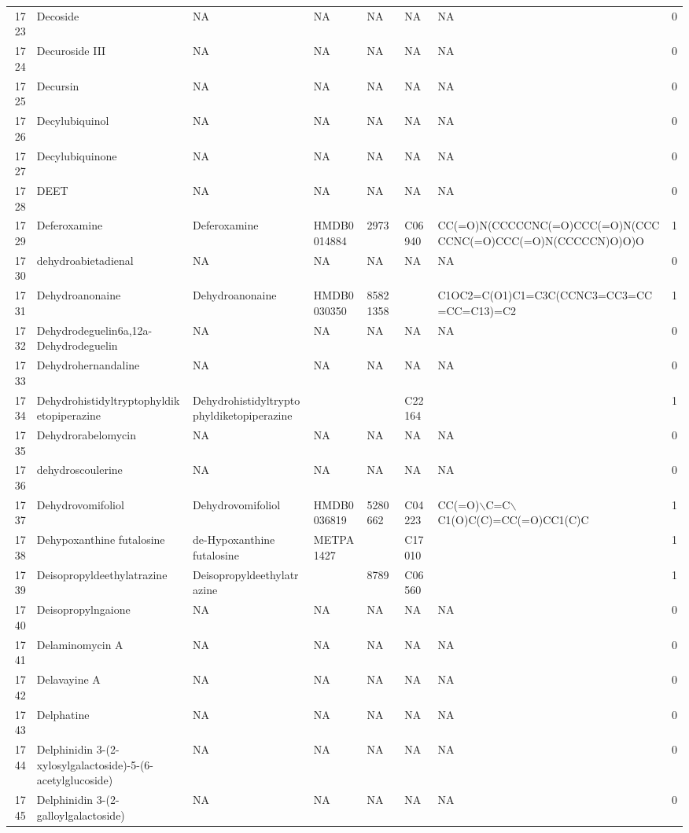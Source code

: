 \documentclass[a4paper]{article}
\begin{document}
\begin{longtable}{rlllllll}
  1723 & Decoside & NA & NA & NA & NA & NA & 0 \\ 
  1724 & Decuroside III & NA & NA & NA & NA & NA & 0 \\ 
  1725 & Decursin & NA & NA & NA & NA & NA & 0 \\ 
  1726 & Decylubiquinol & NA & NA & NA & NA & NA & 0 \\ 
  1727 & Decylubiquinone & NA & NA & NA & NA & NA & 0 \\ 
  1728 & DEET & NA & NA & NA & NA & NA & 0 \\ 
  1729 & Deferoxamine & Deferoxamine & HMDB0014884 & 2973 & C06940 & CC(=O)N(CCCCCNC(=O)CCC(=O)N(CCCCCNC(=O)CCC(=O)N(CCCCCN)O)O)O & 1 \\ 
  1730 & dehydroabietadienal & NA & NA & NA & NA & NA & 0 \\ 
  1731 & Dehydroanonaine & Dehydroanonaine & HMDB0030350 & 85821358 &  & C1OC2=C(O1)C1=C3C(CCNC3=CC3=CC=CC=C13)=C2 & 1 \\ 
  1732 & Dehydrodeguelin6a,12a-Dehydrodeguelin & NA & NA & NA & NA & NA & 0 \\ 
  1733 & Dehydrohernandaline & NA & NA & NA & NA & NA & 0 \\ 
  1734 & Dehydrohistidyltryptophyldiketopiperazine & Dehydrohistidyltryptophyldiketopiperazine &  &  & C22164 &  & 1 \\ 
  1735 & Dehydrorabelomycin & NA & NA & NA & NA & NA & 0 \\ 
  1736 & dehydroscoulerine & NA & NA & NA & NA & NA & 0 \\ 
  1737 & Dehydrovomifoliol & Dehydrovomifoliol & HMDB0036819 & 5280662 & C04223 & CC(=O)$\backslash$C=C$\backslash$C1(O)C(C)=CC(=O)CC1(C)C & 1 \\ 
  1738 & Dehypoxanthine futalosine & de-Hypoxanthine futalosine & METPA1427 &  & C17010 &  & 1 \\ 
  1739 & Deisopropyldeethylatrazine & Deisopropyldeethylatrazine &  & 8789 & C06560 &  & 1 \\ 
  1740 & Deisopropylngaione & NA & NA & NA & NA & NA & 0 \\ 
  1741 & Delaminomycin A & NA & NA & NA & NA & NA & 0 \\ 
  1742 & Delavayine A & NA & NA & NA & NA & NA & 0 \\ 
  1743 & Delphatine & NA & NA & NA & NA & NA & 0 \\ 
  1744 & Delphinidin 3-(2-xylosylgalactoside)-5-(6-acetylglucoside) & NA & NA & NA & NA & NA & 0 \\ 
  1745 & Delphinidin 3-(2-galloylgalactoside) & NA & NA & NA & NA & NA & 0 \\ 

\end{longtable}
\end{document}
